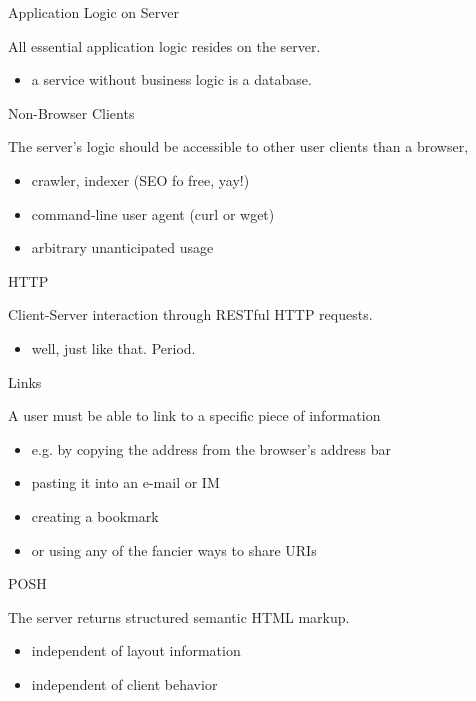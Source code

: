 \documentclass{beamer}
\begin{document}
\begin{frame}{Application Logic on Server}

  All essential application logic resides on the server.

  \begin{itemize}
    \item a service without business logic is a database.
  \end{itemize}
\end{frame}

\begin{frame}{Non-Browser Clients}

  The server's logic should be accessible to other user clients than a browser,

  \begin{itemize}
    \item crawler, indexer (SEO fo free, yay!)
    \item command-line user agent (curl or wget)
    \item arbitrary unanticipated usage
  \end{itemize}
\end{frame}

\begin{frame}{HTTP}

  Client-Server interaction through RESTful HTTP requests.

  \begin{itemize}
    \item well, just like that. Period.
  \end{itemize}
\end{frame}

\begin{frame}{Links}

  A user must be able to link to a specific piece of information

  \begin{itemize}
    \item e.g. by copying the address from the browser's address bar
    \item pasting it into an e-mail or IM
    \item creating a bookmark
    \item or using any of the fancier ways to share URIs
  \end{itemize}
\end{frame}

\begin{frame}{POSH}

  The server returns structured semantic HTML markup.

  \begin{itemize}
    \item independent of layout information
    \item independent of client behavior
  \end{itemize}

\end{frame}
\end{document}
